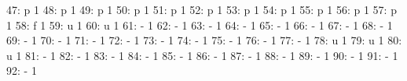 \documentclass[nojss]{jss}
\begin{document}
\begin{Schunk}
\begin{Soutput}
 47:                               p                   1
 48:                               p                   1
 49:                               p                   1
 50:                               p                   1
 51:                               p                   1
 52:                               p                   1
 53:                               p                   1
 54:                               p                   1
 55:                               p                   1
 56:                               p                   1
 57:                               p                   1
 58:                               f                   1
 59:                               u                   1
 60:                               u                   1
 61:                               -                   1
 62:                               -                   1
 63:                               -                   1
 64:                               -                   1
 65:                               -                   1
 66:                               -                   1
 67:                               -                   1
 68:                               -                   1
 69:                               -                   1
 70:                               -                   1
 71:                               -                   1
 72:                               -                   1
 73:                               -                   1
 74:                               -                   1
 75:                               -                   1
 76:                               -                   1
 77:                               -                   1
 78:                               u                   1
 79:                               u                   1
 80:                               u                   1
 81:                               -                   1
 82:                               -                   1
 83:                               -                   1
 84:                               -                   1
 85:                               -                   1
 86:                               -                   1
 87:                               -                   1
 88:                               -                   1
 89:                               -                   1
 90:                               -                   1
 91:                               -                   1
 92:                               -                   1

\end{Soutput}
\end{Schunk}
\end{document}
